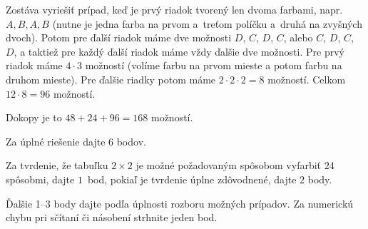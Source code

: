 {Zostáva vyriešiť prípad, keď je prvý riadok tvorený len dvoma farbami, napr. $A, B, A, B$ (nutne je jedna farba na prvom a~treťom políčku a~druhá na zvyšných dvoch). Potom pre ďalší riadok máme dve možnosti $D$, $C$, $D$, $C$, alebo $C$, $D$, $C$, $D$, a taktiež pre každý ďalší riadok máme vždy ďalšie dve možnosti. Pre prvý riadok máme $4\cdot3$ možností (volíme farbu na prvom mieste a potom farbu na druhom mieste). Pre ďalšie riadky potom máme $2\cdot 2\cdot 2=8$ možností. Celkom $12\cdot 8=96$ možností.

\zaver
Dokopy je to $48 + 24+96=168$ možností.

\schemaABC
Za úplné riešenie dajte 6 bodov.

Za tvrdenie, že tabuľku $2\times 2$ je možné požadovaným spôsobom vyfarbiť $24$ spôsobmi, dajte $1$~bod, pokiaľ je tvrdenie úplne zdôvodnené, dajte $2$ body.

Ďalšie 1--3 body dajte podľa úplnosti rozboru možných prípadov. Za numerickú chybu pri sčítaní či násobení strhnite jeden bod.

\endschema
}

